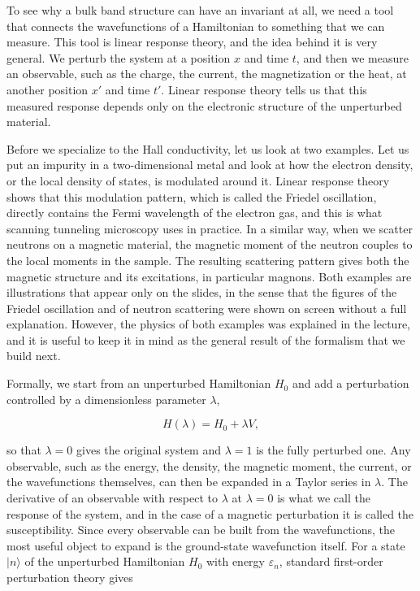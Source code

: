 To see why a bulk band structure can have an invariant at all, we need a tool that connects the
wavefunctions of a Hamiltonian to something that we can measure. This tool is linear response
theory, and the idea behind it is very general. We perturb the system at a position $x$ and time
$t$, and then we measure an observable, such as the charge, the current, the magnetization or the
heat, at another position $x'$ and time $t'$. Linear response theory tells us that this measured
response depends only on the electronic structure of the unperturbed material.

Before we specialize to the Hall conductivity, let us look at two examples. Let us put an impurity in
a two-dimensional metal and look at how the electron density, or the local density of states, is
modulated around it. Linear response theory shows that this modulation pattern, which is called the
Friedel oscillation, directly contains the Fermi wavelength of the electron gas, and this is what
scanning tunneling microscopy uses in practice. In a similar way, when we scatter neutrons on a
magnetic material, the magnetic moment of the neutron couples to the local moments in the sample. The
resulting scattering pattern gives both the magnetic structure and its excitations, in particular
magnons. Both examples are illustrations that appear only on the slides, in the sense that the
figures of the Friedel oscillation and of neutron scattering were shown on screen without a full
explanation. However, the physics of both examples was explained in the lecture, and it is useful to
keep it in mind as the general result of the formalism that we build next.

Formally, we start from an unperturbed Hamiltonian $H_0$ and add a perturbation controlled by a
dimensionless parameter $\lambda$,

\begin{equation*}
H(\lambda) = H_0 + \lambda V,
\end{equation*}

so that $\lambda = 0$ gives the original system and $\lambda = 1$ is the fully perturbed one. Any
observable, such as the energy, the density, the magnetic moment, the current, or the wavefunctions
themselves, can then be expanded in a Taylor series in $\lambda$. The derivative of an observable with
respect to $\lambda$ at $\lambda = 0$ is what we call the response of the system, and in the case of
a magnetic perturbation it is called the susceptibility. Since every observable can be built from
the wavefunctions, the most useful object to expand is the ground-state wavefunction itself. For a
state $|n\rangle$ of the unperturbed Hamiltonian $H_0$ with energy $\varepsilon_n$, standard
first-order perturbation theory gives

